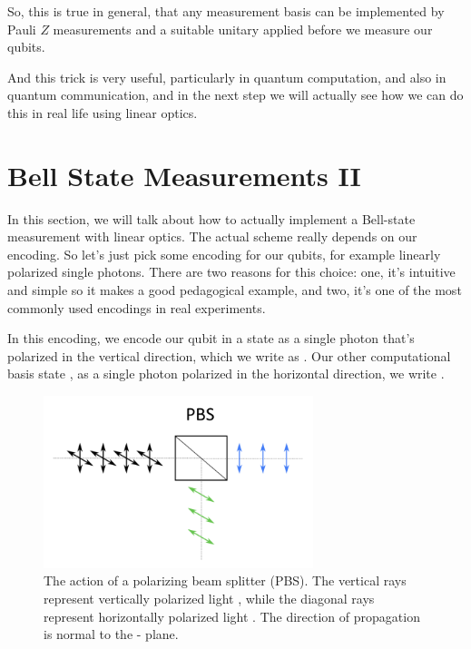 So, this is true in general, that any measurement basis can be implemented by Pauli $Z$ measurements and a suitable unitary applied before we measure our qubits.

And this trick is very useful, particularly in quantum computation, and also in quantum communication, and in the next step we will actually see how we can do this in real life using linear optics.



\section{Bell State Measurements II}
\label{sec:13-3_Bell_state_measurement_2}

In this section, we will talk about how to actually implement a Bell-state measurement with linear optics. The actual scheme really depends on our encoding. So let's just pick some encoding for our qubits, for example linearly polarized single photons. There are two reasons for this choice: one, it's intuitive and simple so it makes a good pedagogical example, and two, it's one of the most commonly used encodings in real experiments.

In this encoding, we encode our qubit in a state  as a single photon that's polarized in the vertical direction, which we write as . Our other computational basis state , as a single photon polarized in the horizontal direction, we write .

\begin{figure}[t]
    \centering
    \includegraphics[width=0.7\textwidth]{lesson13/PBS.png}
    \caption[A polarizing beam splitter (PBS)]{The action of a polarizing beam splitter (PBS).  The vertical rays represent vertically polarized light , while the diagonal rays represent horizontally polarized light .  The direction of propagation is normal to the - plane. }
    \label{fig:13-PBS}
\end{figure}


